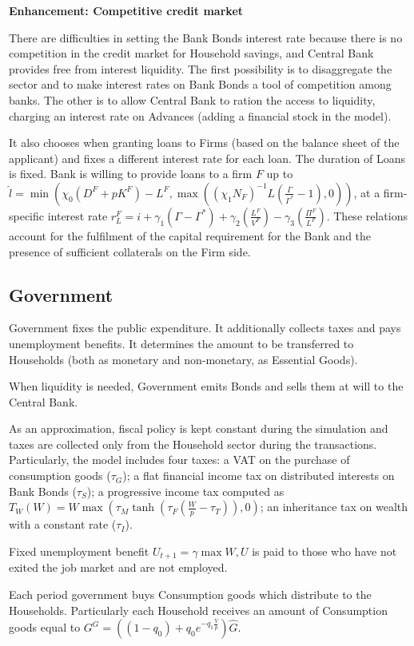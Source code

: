 \documentclass[a4paper, headings=standardclasses]{scrartcl}
\newenvironment{enh}[1][]{\begin{framed}\noindent\textbf{Enhancement: #1}\par}{\end{framed}}
\begin{document}
\begin{enh}[Competitive credit market]
	There are difficulties in setting the Bank Bonds interest rate because there is no competition in the credit market for Household savings, and Central Bank provides free from interest liquidity.
	The first possibility is to disaggregate the sector and to make interest rates on Bank Bonds a tool of competition among banks.
	The other is to allow Central Bank to ration the access to liquidity, charging an interest rate on Advances (adding a financial stock in the model).
\end{enh}

It also chooses when granting loans to Firms (based on the balance sheet of the applicant) and fixes a different interest rate for each loan. The duration of Loans is fixed.
Bank is willing to provide loans to a firm $F$ up to $\hat{l} = \min (\chi_0 (D^F+pK^F) - L^F, \max((\chi_1 N_F)^{-1} L (\frac{\Gamma}{\Gamma^*}-1),0))$, at a firm-specific interest rate $r_L^F = i + \gamma_1 (\Gamma - \Gamma^*) + \gamma_2 (\frac{L^F}{V^F}) - \gamma_3 (\frac{\Pi^F}{L^F})$.
These relations account for the fulfilment of the capital requirement for the Bank and the presence of sufficient collaterals on the Firm side.

\subsection{Government}
Government fixes the public expenditure. It additionally collects taxes and pays unemployment benefits. It determines the amount to be transferred to Households (both as monetary and non-monetary, as Essential Goods).

When liquidity is needed, Government emits Bonds and sells them at will to the Central Bank.

As an approximation, fiscal policy is kept constant during the simulation and taxes are collected only from the Household sector during the transactions. Particularly, the model includes four taxes: a VAT on the purchase of consumption goods ($\tau_G$); a flat financial income tax on distributed interests on Bank Bonds ($\tau_S$); a progressive income tax computed as $T_W(W) = W \max(\tau_M \tanh(\tau_F (\frac{W}{p} - \tau_T)),0)$; an inheritance tax on wealth with a constant rate ($\tau_I$).

Fixed unemployment benefit $U_{t+1} = \gamma \max{W, U}$ is paid to those who have not exited the job market and are not employed.

Each period government buys Consumption goods which distribute to the Households. Particularly each Household receives an amount of Consumption goods equal to $G^G = ((1 - q_0) + q_0 e^{-q_1\frac{V}{p}})\hat{G}$.
\end{document}
